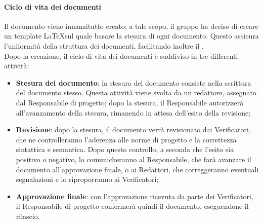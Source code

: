 \documentclass[../norme-di-progetto.tex]{subfiles}
\begin{document}
\paragraph{Ciclo di vita dei documenti}
Il documento viene innanzitutto creato; a tale scopo, il gruppo ha deciso di creare un template \LaTeX sul quale basare la stesura di ogni documento. Questo assicura l'uniformità della struttura dei documenti, facilitando inoltre il . \\
Dopo la creazione, il ciclo di vita dei documenti è suddiviso in tre differenti attività:
\begin{itemize}
  \item \textbf{Stesura del documento}: la stesura del documento consiste nella scrittura del documento stesso. Questa attività viene svolta da un redattore, assegnato dal Responsabile di progetto; dopo la stesura, il Responsabile autorizzerà all'avanzamento della stesura, rimanendo in attesa dell'esito della revisione;
  \item \textbf{Revisione}: dopo la stesura, il documento verrà revisionato dai Verificatori, che ne controlleranno l'aderenza alle norme di progetto e la correttezza sintattica e semantica. Dopo questo controllo, a seconda che l'esito sia positivo o negativo, lo comunicheranno al Responsabile, che farà avanzare il documento all'approvazione finale, o ai Redattori, che correggeranno eventuali segnalazioni e lo riproporranno ai Verificatori;
  \item \textbf{Approvazione finale}: con l'approvazione ricevuta da parte dei Verificatori, il Responsabile di progetto confermerà quindi il documento, eseguendone il rilascio.
\end{itemize}
\end{document}
